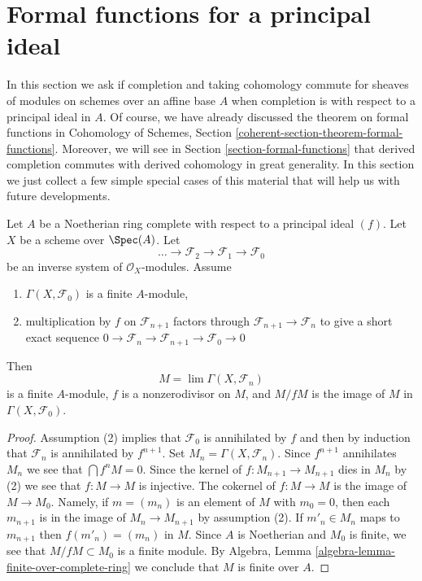 \section{Formal functions for a principal ideal}
\label{section-formal-functions-principal}

\noindent
In this section we ask if completion and taking cohomology commute
for sheaves of modules on schemes over an affine base $A$ when completion
is with respect to a principal ideal in $A$. Of course, we have already
discussed the theorem on formal functions in
Cohomology of Schemes, Section \ref{coherent-section-theorem-formal-functions}.
Moreover, we will see in Section \ref{section-formal-functions}
that derived completion commutes with derived cohomology in great generality.
In this section we just collect a few simple special cases of this material
that will help us with future developments.

\begin{lemma}
\label{lemma-limit-finite}
Let $A$ be a Noetherian ring complete with respect to a principal ideal $(f)$.
Let $X$ be a scheme over $\Spec(A)$. Let
$$
\ldots \to \mathcal{F}_2 \to \mathcal{F}_1 \to \mathcal{F}_0
$$
be an inverse system of $\mathcal{O}_X$-modules. Assume
\begin{enumerate}
\item $\Gamma(X, \mathcal{F}_0)$ is a finite $A$-module,
\item multiplication by $f$ on $\mathcal{F}_{n + 1}$ factors
through $\mathcal{F}_{n + 1} \to \mathcal{F}_n$ to give a
short exact sequence
$0 \to \mathcal{F}_n \to \mathcal{F}_{n + 1} \to \mathcal{F}_0 \to 0$
\end{enumerate}
Then
$$
M = \lim \Gamma(X, \mathcal{F}_n)
$$
is a finite $A$-module, $f$ is a nonzerodivisor on $M$, and
$M/fM$ is the image of $M$ in $\Gamma(X, \mathcal{F}_0)$.
\end{lemma}

\begin{proof}
Assumption (2) implies that $\mathcal{F}_0$ is annihilated by $f$
and then by induction that $\mathcal{F}_n$ is annihilated by $f^{n + 1}$.
Set $M_n = \Gamma(X, \mathcal{F}_n)$. Since $f^{n + 1}$ annihilates
$M_n$ we see that $\bigcap f^nM = 0$. Since the kernel of
$f : M_{n + 1} \to M_{n + 1}$ dies in $M_n$ by (2) we see that
$f : M \to M$ is injective. The cokernel of $f : M \to M$
is the image of $M \to M_0$. Namely, if $m = (m_n)$ is an element
of $M$ with $m_0 = 0$, then each $m_{n + 1}$ is in the image of
$M_n \to M_{n + 1}$ by assumption (2).
If $m'_n \in M_n$ maps to $m_{n + 1}$ then $f(m'_n) = (m_n)$ in $M$.
Since $A$ is Noetherian and $M_0$ is finite, we see that
$M/fM \subset M_0$ is a finite module. By
Algebra, Lemma \ref{algebra-lemma-finite-over-complete-ring}
we conclude that $M$ is finite over $A$.
\end{proof}

